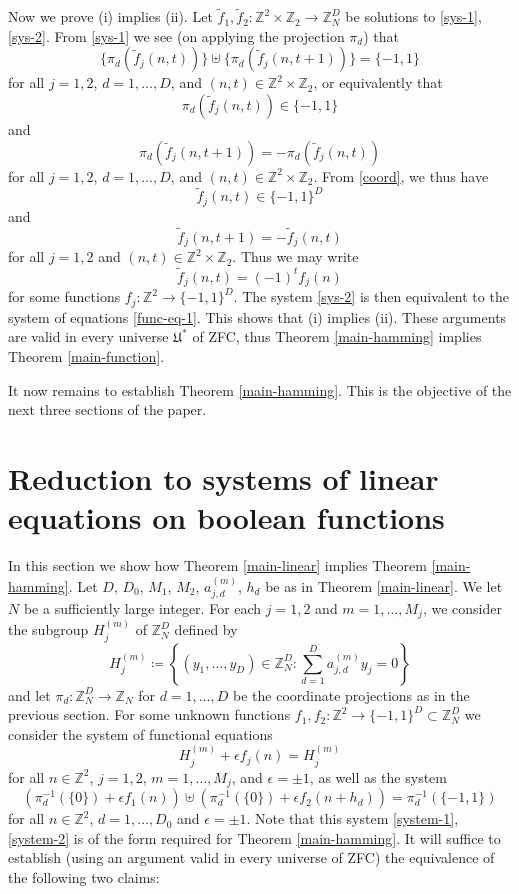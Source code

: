 \documentclass[reqno,a4paper,12pt]{amsart}
\numberwithin{equation}{section}
\numberwithin{figure}{section}
\def\Z{\mathbb{Z}}
\newcommand{\Universe}{{\mathfrak{U}}}
\theoremstyle{plain}
\theoremstyle{definition}
\begin{document}
Now we prove (i) implies (ii).  Let $\tilde f_1, \tilde f_2 \colon \Z^2 \times \Z_2 \to \Z_N^D$ be solutions to \eqref{sys-1}, \eqref{sys-2}.  From \eqref{sys-1} we see (on applying the projection $\pi_d$) that
$$ \{ \pi_d(\tilde f_j(n,t)) \} \uplus
\{ \pi_d(\tilde f_j(n,t+1)) \} = \{-1,1\}$$
for all $j=1,2$, $d=1,\dots,D$, and $(n,t) \in \Z^2 \times \Z_2$, or equivalently that
$$ \pi_d(\tilde f_j(n,t)) \in \{-1,1\}$$
and
$$ \pi_d(\tilde f_j(n,t+1)) = - \pi_d(\tilde f_j(n,t))$$
for all $j=1,2$, $d=1,\dots,D$, and $(n,t) \in \Z^2 \times \Z_2$. 
From \eqref{coord}, we thus have
$$ \tilde f_j(n,t) \in \{-1,1\}^D$$
and
$$ \tilde f_j(n,t+1) = - \tilde f_j(n,t)$$
for all $j=1,2$ and $(n,t) \in \Z^2 \times \Z_2$.  Thus we may write
$$ \tilde f_j(n,t) = (-1)^t f_j(n)$$
for some functions $f_j \colon \Z^2 \to \{-1,1\}^D$.  The system \eqref{sys-2} is then equivalent to the system of equations \eqref{func-eq-1}.  This shows that (i) implies (ii).  These arguments are valid in every universe $\Universe^*$ of ZFC, thus Theorem \ref{main-hamming} implies Theorem \ref{main-function}.

It now remains to establish Theorem \ref{main-hamming}.  This is the objective of the next three sections of the paper.

\section{Reduction to systems of linear equations on boolean functions}\label{linear-sec}

In this section we show how Theorem \ref{main-linear} implies Theorem \ref{main-hamming}. Let $D$, $D_0$, $M_1$, $M_2$, $a_{j,d}^{(m)}$, $h_d$ be as in Theorem \ref{main-linear}.  We let $N$ be a sufficiently large integer.  For each $j=1,2$ and $m = 1,\dots,M_j$, we consider the subgroup $H_j^{(m)}$ of $\Z_N^D$ defined by
\begin{equation}\label{hjm-def}
H_j^{(m)} \coloneqq \left\{ (y_1,\dots,y_D) \in \Z_N^D \colon \sum_{d=1}^D a_{j,d}^{(m)} y_j = 0 \right\}
\end{equation}
and let $\pi_d \colon \Z_N^D \to \Z_N$ for $d=1,\dots,D$ be the coordinate projections as in the previous section.
For some unknown functions $f_1,f_2 \colon \Z^2 \to \{-1,1\}^D \subset \Z_N^D$ we consider the system of functional equations
\begin{equation}\label{system-1}
H_j^{(m)} + \epsilon f_j(n) = H_j^{(m)}
\end{equation}
for all $n \in \Z^2$, $j=1,2$, $m=1,\dots,M_j$, and $\epsilon = \pm 1$, as well as the system
\begin{equation}\label{system-2}
(\pi_d^{-1}(\{0\}) + \epsilon f_1(n)) \uplus (\pi_d^{-1}(\{0\}) + \epsilon f_2(n+h_d)) = \pi_d^{-1}(\{-1,1\})
\end{equation}
for all $n \in \Z^2$, $d=1,\dots,D_0$ and $\epsilon = \pm 1$.  Note that this system \eqref{system-1}, \eqref{system-2} is of the form required for Theorem \ref{main-hamming}.  It will suffice to establish (using an argument valid in every universe of ZFC) the equivalence of the following two claims:
\end{document}
